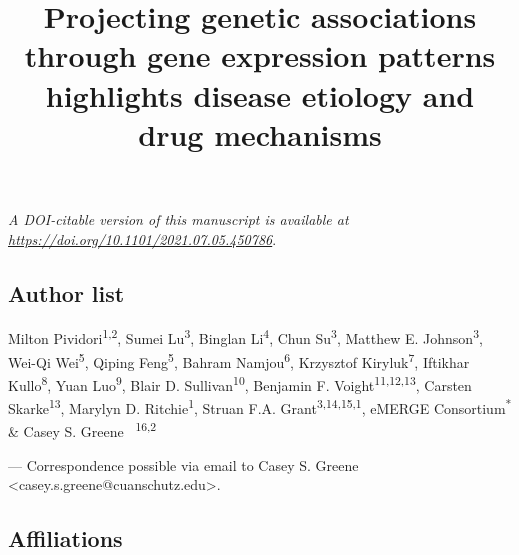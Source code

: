 \documentclass[
  a4paper,
]{article}
\title{Projecting genetic associations through gene expression patterns highlights disease etiology and drug mechanisms}
\author{}
\date{}
\begin{document}
\maketitle

\emph{A DOI-citable version of this manuscript is available at \url{https://doi.org/10.1101/2021.07.05.450786}}.

\hypertarget{authors}{%
\subsection{Author list}\label{authors}}

Milton Pividori\textsuperscript{1,2},
Sumei Lu\textsuperscript{3},
Binglan Li\textsuperscript{4},
Chun Su\textsuperscript{3},
Matthew E. Johnson\textsuperscript{3},
Wei-Qi Wei\textsuperscript{5},
Qiping Feng\textsuperscript{5},
Bahram Namjou\textsuperscript{6},
Krzysztof Kiryluk\textsuperscript{7},
Iftikhar Kullo\textsuperscript{8},
Yuan Luo\textsuperscript{9},
Blair D. Sullivan\textsuperscript{10},
Benjamin F. Voight\textsuperscript{11,12,13},
Carsten Skarke\textsuperscript{13},
Marylyn D. Ritchie\textsuperscript{1},
Struan F.A. Grant\textsuperscript{3,14,15,1},
eMERGE Consortium\textsuperscript{*} \&
Casey S. Greene~\textsuperscript{\protect\hyperlink{correspondence}{\Letter}} \textsuperscript{16,2}

\leavevmode{}%
{\Letter} --- Correspondence possible via email to
Casey S. Greene \textless casey.s.greene@cuanschutz.edu\textgreater.

\hypertarget{affiliations}{%
\subsection{Affiliations}\label{affiliations}}
\end{document}

